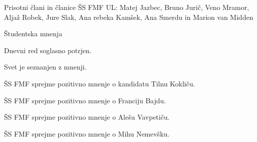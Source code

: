 \documentclass{seja}
\begin{document}
Prisotni člani in članice ŠS FMF UL:
 Matej Jazbec,  Bruno Jurič,  Veno Mramor, Aljaž
Robek,  Jure Slak,  Ana rebeka Kamšek, Ana Smerdu in Marion van Midden

\begin{red}
\item Študentska mnenja
\end{red}
Dnevni red soglasno potrjen.
\begin{ad}
\item Svet je seznanjen z mnenji.
\begin{sklep*}
ŠS FMF sprejme pozitivno mnenje o kandidatu Tilnu Kokliču.
\end{sklep*}
\begin{sklep*}
ŠS FMF sprejme pozitivno mnenje o Franciju Bajdu.
\end{sklep*}
\begin{sklep*}
ŠS FMF sprejme pozitivno mnenje o Alešu Vavpetiču.
\end{sklep*}
\begin{sklep*}
ŠS FMF sprejme pozitivno mnenje o Mihu Nemevšku.
\end{sklep*}
\end{ad}
\end{document}
